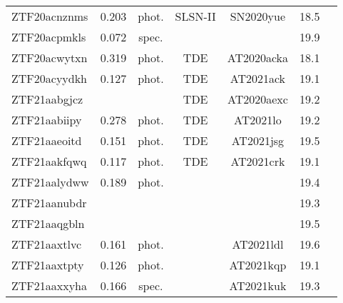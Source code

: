 \begin{table*}
\begin{tabular}{l  c  c  c   c  c  c}
    ZTF20acnznms       & 0.203      & phot.         & SLSN-II                 & SN2020yue         & 18.5                       &                \\
    ZTF20acpmkls       & 0.072      & spec.         & ~                       & ~                 & 19.9                       &                \\
    ZTF20acwytxn       & 0.319      & phot.         & TDE                     & AT2020acka        & 18.1                       &                \\
    ZTF20acyydkh       & 0.127      & phot.         & TDE                     & AT2021ack         & 19.1                       &                \\
    ZTF21aabgjcz       & ~          & ~             & TDE                     & AT2020aexc        & 19.2                       &                \\
    ZTF21aabiipy       & 0.278      & phot.         & TDE                     & AT2021lo          & 19.2                       &                \\
    ZTF21aaeoitd       & 0.151      & phot.         & TDE                     & AT2021jsg         & 19.5                       &                \\
    ZTF21aakfqwq       & 0.117      & phot.         & TDE                     & AT2021crk         & 19.1                       &                \\
    ZTF21aalydww       & 0.189      & phot.         & ~                       & ~                 & 19.4                       &                \\
    ZTF21aanubdr       & ~          & ~             & ~                       & ~                 & 19.3                       &                \\
    ZTF21aaqgbln       & ~          & ~             & ~                       & ~                 & 19.5                       &                \\
    ZTF21aaxtlvc       & 0.161      & phot.         & ~                       & AT2021ldl         & 19.6                       &                \\
    ZTF21aaxtpty       & 0.126      & phot.         & ~                       & AT2021kqp         & 19.1                       &                \\
    ZTF21aaxxyha       & 0.166      & spec.         & ~                       & AT2021kuk         & 19.3                       &                \\

\end{tabular}
\end{table*}
